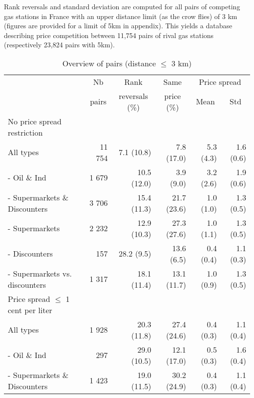 \documentclass[english]{article}
\begin{document}
Rank reversals and standard deviation are computed for all pairs of competing gas stations in France with an upper distance limit (as the crow flies) of 3 km (figures are provided for a limit of 5km in appendix). This yields a database describing price competition between 11,754 pairs of rival gas stations (respectively 23,824 pairs with 5km).

\begin{table}
\begin{threeparttable}
\renewcommand{\arraystretch}{0.8} %
\caption{Overview of pairs (distance $\le$ 3 km)}
\label{tab:stats_pair_rank_reversals}
    \begin{tabular}{lrrrrr}
    \toprule
    \toprule
          & \multicolumn{1}{c}{Nb} & \multicolumn{1}{c}{Rank} & \multicolumn{1}{c}{Same} & \multicolumn{2}{c}{Price spread} \\
          & \multicolumn{1}{c}{pairs} & \multicolumn{1}{c}{reversals (\%)} & \multicolumn{1}{c}{price (\%)} & \multicolumn{1}{c}{Mean} & \multicolumn{1}{c}{Std} \\
    \midrule
    No price spread restriction &       &       &       &       &  \\
    All types & 11 754 & 7.1 (10.8) & 7.8 (17.0) & 5.3 (4.3) & 1.6 (0.6) \\
    - Oil \& Ind & 1 679 & 10.5 (12.0) & 3.9 \phantom{0}(9.0) & 3.2 (2.6) & 1.9 (0.6) \\
    - Supermarkets \& Discounters & 3 706 & 15.4 (11.3) & 21.7 (23.6) & 1.0 (1.0) & 1.3 (0.5) \\
    \hspace*{4mm} - Supermarkets & 2 232 & 12.9 (10.3) & 27.3 (27.6) & 1.0 (1.1) & 1.3 (0.5) \\
    \hspace*{4mm} - Discounters & 157   & 28.2 \phantom{0}(9.5) & 13.6 \phantom{0}(6.5) & 0.4 (0.4) & 1.1 (0.3) \\
    \hspace*{4mm} - Supermarkets vs. discounters & 1 317 & 18.1 (11.4) & 13.1 (11.7) & 1.0 (0.9) & 1.3 (0.5) \\
    \midrule
    Price spread $\le$ 1 cent per liter &       &       &       &       &  \\
    All types & 1 928 & 20.3 (11.8) & 27.4 (24.6) & 0.4 (0.3) & 1.1 (0.4) \\
    - Oil \& Ind & 297   & 29.0 (10.5) & 12.1 (17.0) & 0.5 (0.3) & 1.6 (0.4) \\
    - Supermarkets \& Discounters & 1 423 & 19.0 (11.5) & 30.2 (24.9) & 0.4 (0.3) & 1.1 (0.4) \\

\end{tabular}
\end{threeparttable}
\end{table}
\end{document}
